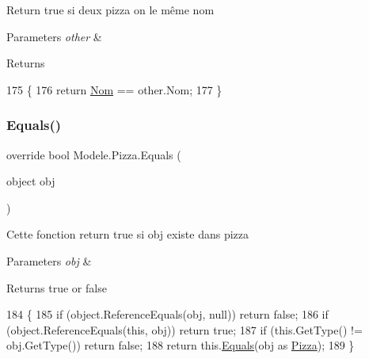 Return true si deux pizza on le même nom 


\begin{DoxyParams}{Parameters}
{\em other} & \\
\hline
\end{DoxyParams}
\begin{DoxyReturn}{Returns}

\end{DoxyReturn}

\begin{DoxyCode}
175         \{
176             \textcolor{keywordflow}{return} \hyperlink{classModele_1_1Pizza_acd4ac908946cc662e4d4dc6e77b302d1}{Nom} == other.Nom;
177         \}
\end{DoxyCode}
\mbox{\label{classModele_1_1Pizza_a06040b5f95e6549d49667a84c490b2c8}} 
\subsubsection{\texorpdfstring{Equals()}{Equals()}\hspace{0.1cm}{\footnotesize\ttfamily [2/2]}}
{\footnotesize\ttfamily override bool Modele.\+Pizza.\+Equals (\begin{DoxyParamCaption}\item[{object}]{obj }\end{DoxyParamCaption})\hspace{0.3cm}{\ttfamily [inline]}}



Cette fonction return true si obj existe dans pizza 


\begin{DoxyParams}{Parameters}
{\em obj} & \\
\hline
\end{DoxyParams}
\begin{DoxyReturn}{Returns}
true or false
\end{DoxyReturn}

\begin{DoxyCode}
184         \{
185             \textcolor{keywordflow}{if} (\textcolor{keywordtype}{object}.ReferenceEquals(obj, null)) \textcolor{keywordflow}{return} \textcolor{keyword}{false};
186             \textcolor{keywordflow}{if} (\textcolor{keywordtype}{object}.ReferenceEquals(\textcolor{keyword}{this}, obj)) \textcolor{keywordflow}{return} \textcolor{keyword}{true};
187             \textcolor{keywordflow}{if} (this.GetType() != obj.GetType()) \textcolor{keywordflow}{return} \textcolor{keyword}{false};
188             \textcolor{keywordflow}{return} this.\hyperlink{classModele_1_1Pizza_aae4081338f65215bfcdc7845de6429e9}{Equals}(obj as \hyperlink{classModele_1_1Pizza_aa413a214f45c475db7517a309bf3cff1}{Pizza});
189         \}
\end{DoxyCode}
\mbox{\label{classModele_1_1Pizza_a15e2cc3fa52744672667a3877859948f}} 

